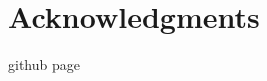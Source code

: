 \documentclass[letterpaper]{article}
\begin{document}
\section{Acknowledgments}
github page

\footnotesize



\end{document}
